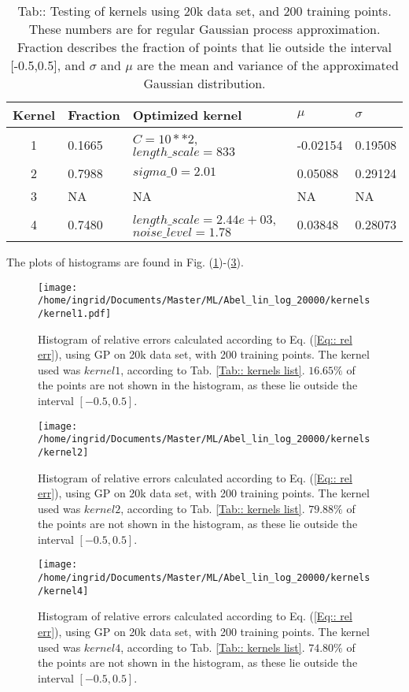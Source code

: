 \documentclass[twoside,english]{uiofysmaster}
\begin{document}
\begin{table}
\begin{tabular}{|c|l|l|l|l|}
\hline
Kernel & Fraction & Optimized kernel & $\mu$ & $\sigma$\\
\hline
1 & 0.1665 & $C = 10**2$, $length\_scale=833$ & -0.02154 & 0.19508\\
2 & 0.7988 & $sigma\_0=2.01$ & 0.05088 & 0.29124\\
3 & NA & NA & NA & NA\\
4 & 0.7480 & $length\_scale=2.44e+03$, $ noise\_level=1.78$ & 0.03848 & 0.28073\\
\hline
\end{tabular}
\caption{Tab:: Testing of kernels using 20k data set, and 200 training points. These numbers are for regular Gaussian process approximation. Fraction describes the fraction of points that lie outside the interval [-0.5,0.5], and $\sigma$ and $\mu$ are the mean and variance of the approximated Gaussian distribution.}
\end{table}

The plots of histograms are found in Fig. (\ref{Fig:: GP 20k 200training kernel1})-(\ref{Fig:: GP 20k 200training kernel3}).

\begin{figure}
\centering
\texttt{[image: /home/ingrid/Documents/Master/ML/Abel\_lin\_log\_20000/kernels/kernel1.pdf]}
\caption{Histogram of relative errors calculated according to Eq. (\ref{Eq:: rel err}), using GP on 20k data set, with 200 training points. The kernel used was $kernel1$, according to Tab. \ref{Tab:: kernels list}. $16.65 \%$ of the points are not shown in the histogram, as these lie outside the interval $[-0.5, 0.5]$.}
\label{Fig:: GP 20k 200training kernel1}
\end{figure}

\begin{figure}
\centering
\texttt{[image: /home/ingrid/Documents/Master/ML/Abel\_lin\_log\_20000/kernels/kernel2]}
\caption{Histogram of relative errors calculated according to Eq. (\ref{Eq:: rel err}), using GP on 20k data set, with 200 training points. The kernel used was $kernel2$, according to Tab. \ref{Tab:: kernels list}. $79.88 \%$ of the points are not shown in the histogram, as these lie outside the interval $[-0.5, 0.5]$.}
\label{Fig:: GP 20k 200training kernel2}
\end{figure}

\begin{figure}
\centering
\texttt{[image: /home/ingrid/Documents/Master/ML/Abel\_lin\_log\_20000/kernels/kernel4]}
\caption{Histogram of relative errors calculated according to Eq. (\ref{Eq:: rel err}), using GP on 20k data set, with 200 training points. The kernel used was $kernel4$, according to Tab. \ref{Tab:: kernels list}. $74.80 \%$ of the points are not shown in the histogram, as these lie outside the interval $[-0.5, 0.5]$.}
\label{Fig:: GP 20k 200training kernel3}
\end{figure}
\end{document}
